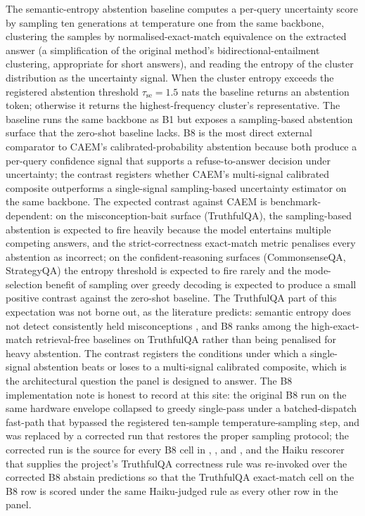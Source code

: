 The semantic-entropy abstention baseline \cite{farquhar2024semantic} computes a per-query uncertainty score by sampling ten generations at temperature one from the same backbone, clustering the samples by normalised-exact-match equivalence on the extracted answer (a simplification of the original method's bidirectional-entailment clustering, appropriate for short answers), and reading the entropy of the cluster distribution as the uncertainty signal. When the cluster entropy exceeds the registered abstention threshold $\tau_{\text{se}} = 1.5$ nats the baseline returns an abstention token; otherwise it returns the highest-frequency cluster's representative. The baseline runs the same backbone as B1 but exposes a sampling-based abstention surface that the zero-shot baseline lacks. B8 is the most direct external comparator to CAEM's calibrated-probability abstention because both produce a per-query confidence signal that supports a refuse-to-answer decision under uncertainty; the contrast registers whether CAEM's multi-signal calibrated composite outperforms a single-signal sampling-based uncertainty estimator on the same backbone. The expected contrast against CAEM is benchmark-dependent: on the misconception-bait surface (TruthfulQA), the sampling-based abstention is expected to fire heavily because the model entertains multiple competing answers, and the strict-correctness exact-match metric penalises every abstention as incorrect; on the confident-reasoning surfaces (CommonsenseQA, StrategyQA) the entropy threshold is expected to fire rarely and the mode-selection benefit of sampling over greedy decoding is expected to produce a small positive contrast against the zero-shot baseline. The TruthfulQA part of this expectation was not borne out, as the literature predicts: semantic entropy does not detect consistently held misconceptions \cite{farquhar2024semantic}, and B8 ranks among the high-exact-match retrieval-free baselines on TruthfulQA rather than being penalised for heavy abstention. The contrast registers the conditions under which a single-signal abstention beats or loses to a multi-signal calibrated composite, which is the architectural question the panel is designed to answer. The B8 implementation note is honest to record at this site: the original B8 run on the same hardware envelope collapsed to greedy single-pass under a batched-dispatch fast-path that bypassed the registered ten-sample temperature-sampling step, and was replaced by a corrected run that restores the proper sampling protocol; the corrected run is the source for every B8 cell in , , and , and the Haiku rescorer that supplies the project's TruthfulQA correctness rule was re-invoked over the corrected B8 abstain predictions so that the TruthfulQA exact-match cell on the B8 row is scored under the same Haiku-judged rule as every other row in the panel.


